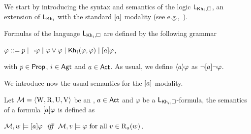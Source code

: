 We start by introducing the syntax and semantics of the logic $\mathsf{L}_{{\sf Kh}_i,\square}$,  an extension of $\mathsf{L}_{{\sf Kh}_i}$ with the standard $[a]$ modality (see e.g.,~\cite{HML,mlbook}).

\medskip

\begin{definition}\label{def:khimlsyntax}
Formulas of the language $\mathsf{L}_{{\sf Kh}_i,\square}$ are defined by the following grammar
\begin{spcenter}
$\varphi ::= p \mid \neg\varphi \mid \varphi\vee\varphi \mid {\sf Kh}_i(\varphi,\varphi) \mid [a]\varphi$,
\end{spcenter}
with $p \in {\rm \sf Prop}$, $i \in {\rm \sf Agt}$ and $a \in {\rm \sf Act}$.
As usual, we define $\langle a \rangle\varphi$ as $\neg[a]\neg\varphi$. %
\end{definition}

\medskip

We introduce now the usual semantics for the $[a]$ modality.

\medskip

\begin{definition}\label{def:khimlsemantics}
Let $\mathcal{M} = \langle \operatorname{W}, \operatorname{R}, \operatorname{U}, \operatorname{V} \rangle$ be an \ults, $a \in {\rm \sf Act}$ and $\varphi$ be a $\mathsf{L}_{{\sf Kh}_i,\square}$-formula, the semantics of a formula $[a]\varphi$ is defined as
\begin{spcenter}
$\modults,w \models \mlbox{a}\varphi \ \ \iff \ \ \modults,v \models \varphi \mbox{ for all }v \in \R_a(w)$.
\end{spcenter}
\end{definition}
